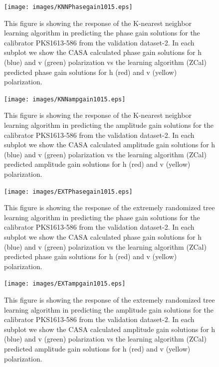 \begin{figure}[H]
    \texttt{[image: images/KNNPhasegain1015.eps]}
    \caption{This figure is showing the response of the K-nearest neighbor learning algorithm in predicting the phase gain solutions for the calibrator PKS1613-586 from the validation dataset-2. In each subplot we show the CASA calculated phase gain solutions for h (blue) and v (green) polarization vs the learning algorithm (ZCal) predicted phase gain solutions for h (red) and v (yellow) polarization.}
    \label{obs7}
\end{figure}

\begin{figure}[H]
    \texttt{[image: images/KNNampgain1015.eps]}
    \caption{This figure is showing the response of the K-nearest neighbor learning algorithm in predicting the amplitude gain solutions for the calibrator PKS1613-586 from the validation dataset-2. In each subplot we show the CASA calculated amplitude gain solutions for h (blue) and v (green) polarization vs the learning algorithm (ZCal) predicted amplitude gain solutions for h (red) and v (yellow) polarization.}
     \label{ka2}
\end{figure}

\begin{figure}[H]
    \texttt{[image: images/EXTPhasegain1015.eps]}
    \caption{This figure is showing the response of the extremely randomized tree learning algorithm in predicting the phase gain solutions for the calibrator PKS1613-586 from the validation dataset-2. In each subplot we show the CASA calculated phase gain solutions for h (blue) and v (green) polarization vs the learning algorithm (ZCal) predicted phase gain solutions for h (red) and v (yellow) polarization.}
    \label{obs8}
\end{figure}

\begin{figure}[H]
    \texttt{[image: images/EXTampgain1015.eps]}
    \caption{This figure is showing the response of the extremely randomized tree learning algorithm in predicting the amplitude gain solutions for the calibrator PKS1613-586 from the validation dataset-2. In each subplot we show the CASA calculated amplitude gain solutions for h (blue) and v (green) polarization vs the learning algorithm (ZCal) predicted amplitude gain solutions for h (red) and v (yellow) polarization.}
     \label{ea2}
\end{figure}


